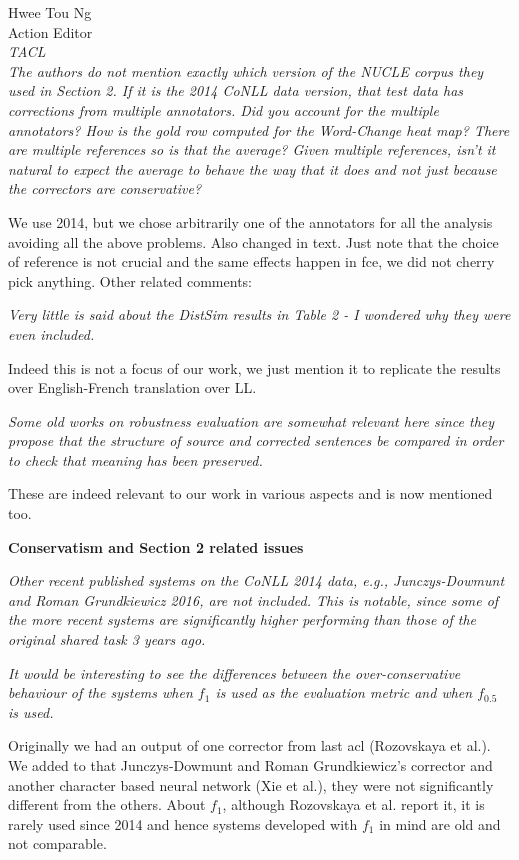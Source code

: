\documentclass[11pt,letterpaper]{letter}
\begin{document}
\begin{letter}{%
Hwee Tou Ng\\
Action Editor\\
{\em TACL}\\
}
\emph{ The authors do not mention exactly which version of the NUCLE corpus
	they used in Section 2. If it is the 2014 CoNLL data version, that test data
	has corrections from multiple annotators. Did you account for the multiple
	annotators? How is the gold row computed for the Word-Change heat map? There
	are multiple references so is that the average? Given multiple references,
	isn't it natural to expect the average to behave the way that it does and
	not just because the correctors are conservative?}

We use 2014, but we chose arbitrarily one of the annotators for all the analysis avoiding all the above problems. Also changed in text. Just note that the choice of reference is not crucial and the same effects happen in fce, we did not cherry pick anything.
Other related comments:
	
\emph{Very little is said about the DistSim results in Table 2 - I wondered why
	they were even included.
	}
	
	Indeed this is not a focus of our work, we just mention it to replicate the results over English-French translation over LL.
	
\emph{Some old works on robustness evaluation are somewhat relevant here since
	they propose that the structure of source and corrected sentences be
	compared in order to check that meaning has been preserved. 
	}
	
	These are indeed relevant to our work in various aspects and is now mentioned too.

{\bf Conservatism and Section 2 related issues}

\emph{Other recent published systems on the CoNLL 2014 data, e.g., Junczys-Dowmunt
	and Roman Grundkiewicz 2016, are not included. This is notable, since some
	of the more recent systems are significantly higher performing than those of
	the original shared task 3 years ago.
	}
	
\emph{It would be interesting to see the differences between the over-conservative
	behaviour of the systems when $f_1$ is used as the evaluation metric and when
	$f_0.5$ is used.}

	Originally we had an output of one corrector from last acl (Rozovskaya et al.). We added to that Junczys-Dowmunt and Roman Grundkiewicz's corrector  and another character based neural network (Xie et al.), they were not significantly different from the others.
	About $f_1$, although Rozovskaya et al. report it, it is rarely used since 2014 and hence systems developed with $f_1$ in mind are old and not comparable.
	

\end{letter}
\end{document}
